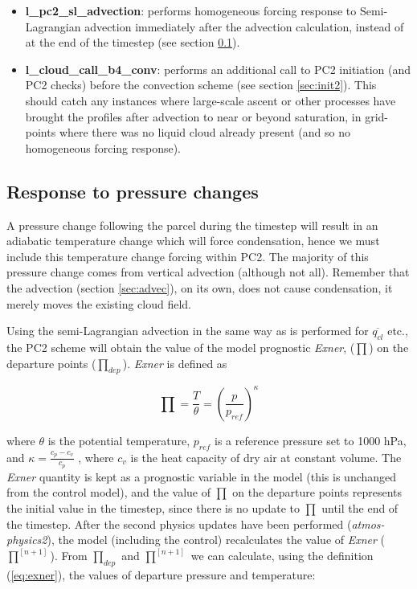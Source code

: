 \documentclass{UMDP_article}
\begin{document}
\begin{itemize}
\item {\bf l\_pc2\_sl\_advection}: performs homogeneous forcing response
to Semi-Lagrangian advection immediately after the advection calculation,
instead of at the end of the timestep (see section \ref{sec:pres}).
\item {\bf l\_cloud\_call\_b4\_conv}: performs an additional call to
PC2 initiation (and PC2 checks) before the convection scheme
(see section \ref{sec:init2}).
This should catch any instances where large-scale ascent or other processes
have brought the profiles after advection to near or beyond saturation,
in grid-points where there was no liquid cloud already present
(and so no homogeneous forcing response).
\end{itemize}

\subsection{Response to pressure changes}
  \label{sec:pres}

A pressure change following the parcel during the timestep will result
in an adiabatic temperature change which will force condensation,
hence we must include this temperature change forcing within PC2.
The majority of this pressure change comes from vertical advection
(although not all).
Remember that the advection (section \ref{sec:advec}), on its own,
does not cause condensation, it merely moves the existing cloud field. 

  Using the semi-Lagrangian advection in the same way as is performed
for $\overline{q_{cl}}$ etc., the PC2 scheme will obtain the value of the
model prognostic \textit{Exner}, ($\prod$) on the departure points
($\prod_{dep}$). \textit{Exner} is defined as

\begin{equation}
\label{eq:exner}
\prod = \frac{T}{\theta} = \left( \frac{p}{p_{ref}} \right)^{\kappa}
\end{equation}

where $\theta$ is the potential temperature, $p_{ref}$ is a reference
pressure set to 1000 hPa, and $\kappa =
\frac{c_p - c_v}{c_p}$ , where $c_v$ is the heat capacity of dry
air at constant volume. The \textit{Exner} quantity is kept as a prognostic
variable in the model (this is unchanged from the control model), and the
value of $\prod$ on the departure points represents the initial value
in the timestep, since there is no update to $\prod$ until the end of
the timestep. After the second physics updates have been performed
(\textit{atmos-physics2}), the
model (including the control) recalculates the value of \textit{Exner}
($\prod^{[n+1]}$).
From $\prod_{dep}$ and $\prod^{[n+1]}$ we can calculate, using the definition
(\ref{eq:exner}), the values of departure pressure and temperature:
\end{document}
